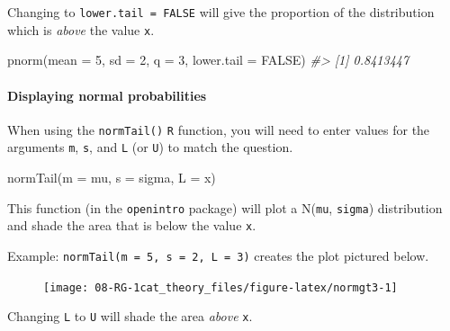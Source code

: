 \documentclass[
]{report}
\newenvironment{Shaded}{\begin{snugshade}}{\end{snugshade}}
\newcommand{\AttributeTok}[1]{\textcolor[rgb]{0.77,0.63,0.00}{#1}}
\newcommand{\CommentTok}[1]{\textcolor[rgb]{0.56,0.35,0.01}{\textit{#1}}}
\newcommand{\ConstantTok}[1]{\textcolor[rgb]{0.00,0.00,0.00}{#1}}
\newcommand{\DecValTok}[1]{\textcolor[rgb]{0.00,0.00,0.81}{#1}}
\newcommand{\FunctionTok}[1]{\textcolor[rgb]{0.00,0.00,0.00}{#1}}
\newcommand{\NormalTok}[1]{#1}
\begin{document}
\newpage

Changing to \texttt{lower.tail\ =\ FALSE} will give the proportion of the distribution which is \emph{above} the value \texttt{x}.

\begin{Shaded}
\begin{Highlighting}[]
\FunctionTok{pnorm}\NormalTok{(}\AttributeTok{mean =} \DecValTok{5}\NormalTok{, }\AttributeTok{sd =} \DecValTok{2}\NormalTok{, }\AttributeTok{q =} \DecValTok{3}\NormalTok{, }\AttributeTok{lower.tail =} \ConstantTok{FALSE}\NormalTok{)}
\CommentTok{\#\textgreater{} [1] 0.8413447}
\end{Highlighting}
\end{Shaded}

\hypertarget{displaying-normal-probabilities}{%
\paragraph*{Displaying normal probabilities}\label{displaying-normal-probabilities}}

When using the \texttt{normTail()} \texttt{R} function, you will need to enter values for the arguments \texttt{m}, \texttt{s}, and \texttt{L} (or \texttt{U}) to match the question.

\begin{Shaded}
\begin{Highlighting}[]
\FunctionTok{normTail}\NormalTok{(}\AttributeTok{m =}\NormalTok{ mu, }\AttributeTok{s =}\NormalTok{ sigma, }\AttributeTok{L =}\NormalTok{ x)}
\end{Highlighting}
\end{Shaded}

This function (in the \texttt{openintro} package) will plot a N(\texttt{mu}, \texttt{sigma}) distribution and shade the area that is below the value \texttt{x}.

Example: \texttt{normTail(m\ =\ 5,\ s\ =\ 2,\ L\ =\ 3)} creates the plot pictured below.

\begin{figure}

{\centering \texttt{[image: 08-RG-1cat\_theory\_files/figure-latex/normgt3-1]} 

}

\end{figure}

Changing \texttt{L} to \texttt{U} will shade the area \emph{above} \texttt{x}.
\end{document}
